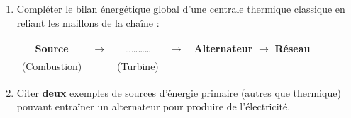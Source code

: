 \documentclass[11pt]{article}
\begin{document}
\begin{exercice}
\begin{enumerate}
    \item Compléter le bilan énergétique global d'une centrale thermique classique en reliant les maillons de la chaîne :
    \begin{center}
    \begin{tabular}{c c c c c}
    \textbf{Source} & $\longrightarrow$ & \ldots\ldots\ldots\ldots & $\longrightarrow$ & \textbf{Alternateur} $\longrightarrow$ \textbf{Réseau} \\
    (Combustion) & & (Turbine) & & 
    \end{tabular}
    \end{center}
    \item Citer \textbf{deux} exemples de sources d'énergie primaire (autres que thermique) pouvant entraîner un alternateur pour produire de l'électricité.
\end{enumerate}
\end{exercice}
\end{document}
